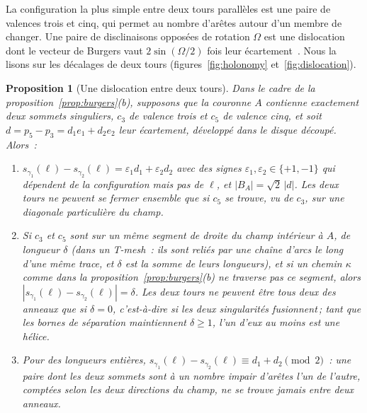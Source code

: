 \documentclass[11pt,a4paper]{article}
\newtheorem{proposition}{Proposition}
\newcommand{\shift}{s}
\newcommand{\lean}[1]{\texttt{\detokenize{#1}}}
\newenvironment{evidence}[3][]{}{}
\begin{document}
La configuration la plus simple entre deux tours parallèles est une paire de
valences trois et cinq, qui permet au nombre d'arêtes autour d'un membre de
changer. Une paire de disclinaisons opposées de rotation $\Omega$ est une
dislocation dont le vecteur de Burgers vaut $2\sin(\Omega/2)$ fois leur
écartement~\cite[éq.~(5)]{kleman2008disclinations}. Nous la lisons sur les
décalages de deux tours (figures~\ref{fig:holonomy}
et~\ref{fig:dislocation}).

\begin{evidence}{core}{\lean{dislocation_burgers}, \lean{dislocation}, \lean{dislocation_closes_iff}\,; testé~: (i) sur 5 couronnes contenant une paire 3--5 de 50 instances aléatoires\,; supposé~: comme dans la proposition ci-dessus}
\begin{proposition}[Une dislocation entre deux tours]\label{prop:dislocation}
Dans le cadre de la proposition~\ref{prop:burgers}(b), supposons que la
couronne $A$ contienne exactement deux sommets singuliers, $c_3$ de valence
trois et $c_5$ de valence cinq, et soit $d = p_5 - p_3 = d_1 e_1 + d_2 e_2$
leur écartement, développé dans le disque découpé. Alors~:
\begin{enumerate}
\item[(i)] $\shift_{\gamma_1}(\ell) - \shift_{\gamma_2}(\ell) = \varepsilon_1
  d_1 + \varepsilon_2 d_2$ avec des signes $\varepsilon_1, \varepsilon_2 \in
  \{+1, -1\}$ qui dépendent de la configuration mais pas de $\ell$, et $|B_A|
  = \sqrt2\,|d|$. Les deux tours ne peuvent se fermer ensemble que si $c_5$
  se trouve, vu de $c_3$, sur une diagonale particulière du champ.
\item[(ii)] Si $c_3$ et $c_5$ sont sur un même segment de droite du champ
  intérieur à $A$, de longueur $\delta$ (dans un T-mesh~: ils sont reliés par
  une chaîne d'arcs le long d'une même trace, et $\delta$ est la somme de
  leurs longueurs), et si un chemin $\kappa$ comme dans la
  proposition~\ref{prop:burgers}(b) ne traverse pas ce segment, alors
  $|\shift_{\gamma_1}(\ell) - \shift_{\gamma_2}(\ell)| = \delta$. Les deux
  tours ne peuvent être tous deux des anneaux que si $\delta = 0$,
  c'est-à-dire si les deux singularités fusionnent\,; tant que les bornes de
  séparation maintiennent $\delta \ge 1$, l'un d'eux au moins est une hélice.
\item[(iii)] Pour des longueurs entières, $\shift_{\gamma_1}(\ell) -
  \shift_{\gamma_2}(\ell) \equiv d_1 + d_2 \pmod 2$~: une paire dont les deux
  sommets sont à un nombre impair d'arêtes l'un de l'autre, comptées selon les
  deux directions du champ, ne se trouve jamais entre deux anneaux.
\end{enumerate}
\end{proposition}
\end{evidence}
\end{document}
